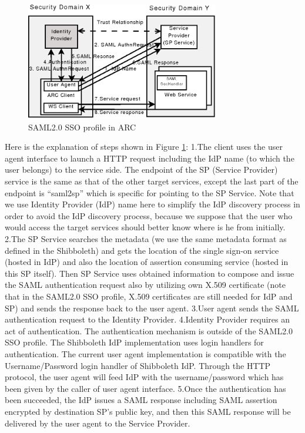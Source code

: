 \documentclass[twocolumn]{svjour3}         %
\begin{document}
\begin{figure}
\includegraphics[width=0.75\textwidth]{SAML2SSO.png}
\caption{SAML2.0 SSO profile in ARC}
\label{fig:SAML2SSO}
\end{figure}
Here is the explanation of steps shown in Figure \ref{fig:SAML2SSO}:
1.The client uses the user agent interface to launch a HTTP request including the IdP name (to which the user belongs) to the service side. The endpoint of the SP (Service Provider) service is the same as that of the other target services, except the last part of the endpoint is “saml2sp” which is specific for pointing to the SP Service. Note that we use Identity Provider (IdP) name here to simplify the IdP discovery process in order to avoid the IdP discovery process, because we suppose that the user who would access the target services should better know where is he from initially.
2.The SP Service searches the metadata (we use the same metadata format as defined in the Shibboleth) and gets the location of the single sign-on service (hosted in IdP) and also the location of assertion consuming service (hosted in this SP itself). Then SP Service uses obtained information to compose and issue the SAML authentication request also by utilizing own X.509 certificate (note that in the SAML2.0 SSO profile, X.509 certificates are still needed for IdP and SP) and sends the response back to the user agent.
3.User agent sends the SAML authentication request to the Identity Provider.
4.Identity Provider requires an act of authentication. The authentication mechanism is outside of the SAML2.0 SSO profile. The Shibboleth IdP implementation uses login handlers for authentication. The current user agent implementation is compatible with the Username/Password login handler of Shibboleth IdP. Through the HTTP protocol, the user agent will feed IdP with the username/password which has been given by the caller of user agent interface.
5.Once the authentication has been succeeded, the IdP issues a SAML response including SAML assertion encrypted by destination SP’s public key, and then this SAML response will be delivered by the user agent to the Service Provider.
\end{document}

